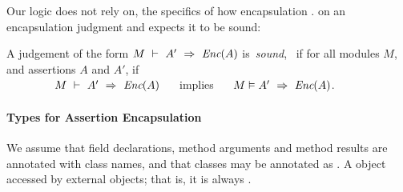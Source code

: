 
Our logic does not  rely on, the specifics of  how   encapsulation
.
 on an encapsulation judgment and expects it to be sound:

\begin{definition}
\label{lem:encap-soundness}
A judgement of the form $M\ \vdash\ A'\ \Rightarrow\ \textit{Enc}(A)$  is\  \emph{sound}, \ if 
for all modules $M$, and assertions $A$ and $A'$, if \\

$\strut \hspace{1.5cm} M\ \vdash\ A'\ \Rightarrow\ \textit{Enc}(A)\ \ \ \ $ implies $\ \ \ \ \satisfies{M}{\givenA{A'}{\encaps{A}}}$.
\end{definition}





\paragraph{Types for Assertion Encapsulation}
\label{types}
We assume that 
field declarations, method arguments
and method results are annotated with class names, and that classes may  
be annotated as \enclosed. A  \enclosed object  
 accessed by external objects; that is, it is always \inside. 


